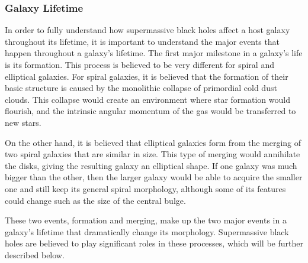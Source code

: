\documentclass[12pt]{article}
\begin{document}
    \subsubsection{Galaxy Lifetime}
    In order to fully understand how supermassive black holes affect a host
    galaxy throughout its lifetime, it is important to understand the major
    events that happen throughout a galaxy's lifetime.  The first major
    milestone in a galaxy's life is its formation.  This process is believed to
    be very different for spiral and elliptical galaxies.  For spiral galaxies,
    it is believed that the formation of their basic structure is caused by
    the monolithic collapse of primordial cold dust clouds.  This collapse would
    create an environment where star formation would flourish, and the intrinsic
    angular momentum of the gas would be transferred to new stars.

    On the other
    hand, it is believed that elliptical galaxies form from the merging of two
    spiral galaxies that are similar in size.  This type of merging would
    annihilate the disks, giving the resulting galaxy an elliptical shape.  If
    one galaxy was much bigger than the other, then the larger galaxy would be
    able to acquire the smaller one and still keep its general spiral
    morphology, although some of its features could change such as the size of
    the central bulge.

    These two events, formation and merging, make up the two major events in a
    galaxy's lifetime that dramatically change its morphology.  Supermassive
    black holes are believed to play significant roles in these processes, which
    will be further described below.
\end{document}
